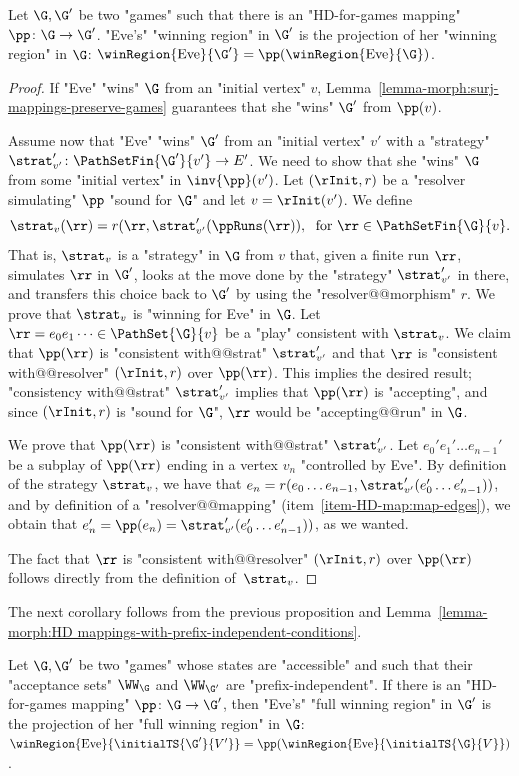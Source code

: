 \documentclass[10pt,a4paper]{amsart}
\newcommand{\Eve}{\mathrm{Eve}}
\begin{document}
\begin{proposition}\label{prop-morph:HD mappings-preserve-games}
	Let $\G, \G'$ be two "games" such that there is an "HD-for-games mapping" $\pp\colon \G \to \G'$. "Eve's" "winning region" in $\G'$ is the projection of her "winning region" in $\G$: $\winRegion{\Eve}{\G'} = \pp(\winRegion{\Eve}{\G})$.	
\end{proposition}
\begin{proof}
	If "Eve" "wins" $\G$ from an "initial vertex" $v$, Lemma~\ref{lemma-morph:surj-mappings-preserve-games} guarantees that she "wins" $\G'$ from $\pp(v)$.
	
	Assume now that "Eve" "wins" $\G'$ from an "initial vertex" $v'$ with a "strategy" $\strat'_{v'}\colon \PathSetFin{\G'}{v'}\to E'$. We need to show that she "wins" $\G$ from some "initial vertex" in $\inv{\pp}(v')$. Let $(\rInit,r)$ be a "resolver simulating" $\pp$ "sound for $\G$" and let $v=\rInit(v')$.  We define
	\[\strat_{v}(\rr) = r(\rr, \strat'_{v'}(\ppRuns(\rr)), \; \text{ for } \rr\in \PathSetFin{\G}{v}.\]
	 That  is, $\strat_{v}$ is a "strategy" in $\G$ from $v$ that, given a finite run $\rr$, simulates $\rr$ in $\G'$, looks at the move done by the "strategy" $\strat'_{v'}$ in there, and transfers this choice back to $\G'$ by using the "resolver@@morphism" $r$. We prove that $\strat_{v}$ is "winning for Eve" in $\G$. Let $\rr = e_0e_1\dots\in \PathSet{\G}{v}$ be a "play" consistent with $\strat_{v}$. We claim that $\pp(\rr)$  is "consistent with@@strat" $\strat'_{v'}$ and that $\rr$ is "consistent with@@resolver" $(\rInit,r)$ over $\pp(\rr)$. This implies the desired result; "consistency with@@strat" $\strat'_{v'}$ implies that $\pp(\rr)$ is "accepting", and since $(\rInit,r)$ is "sound for $\G$", $\rr$ would be "accepting@@run" in $\G$.
	
	We prove that $\pp(\rr)$ is "consistent with@@strat" $\strat'_{v'}$. Let $e_0'e_1'\dots e_{n-1}'$ be a subplay of $\pp(\rr)$ ending in a vertex $v_n$ "controlled by Eve". By definition of the strategy $\strat_{v}$, we have that $e_n = r(e_0\dots e_{n-1}, \strat'_{v'}(e_0'\dots e_{n-1}'))$, and by definition of a "resolver@@mapping" (item~\ref{item-HD-map:map-edges}), we obtain that $e_n' = \pp(e_n) = \strat'_{v'}(e_0'\dots e_{n-1}'))$, as we wanted.
	
	The fact that $\rr$ is "consistent with@@resolver" $(\rInit,r)$ over $\pp(\rr)$ follows directly from the definition of~$\strat_{v}$.
\end{proof}

The next corollary follows from the previous proposition and Lemma~\ref{lemma-morph:HD mappings-with-prefix-independent-conditions}.
\begin{corollary}\label{cor-morph:HD-map-preserve-full-WR}
	Let $\G, \G'$ be two "games" whose states are "accessible" and such that their "acceptance sets" $\WW_\G$ and $\WW_{\G'}$ are "prefix-independent". If there is an "HD-for-games mapping" $\pp\colon \G \to \G'$, then "Eve's" "full winning region" in $\G'$ is the projection of her "full winning region" in $\G$: $\winRegion{\Eve}{\initialTS{\G'}{V'}} = \pp(\winRegion{\Eve}{\initialTS{\G}{V}})$.	
\end{corollary} 	
	
\end{document}
